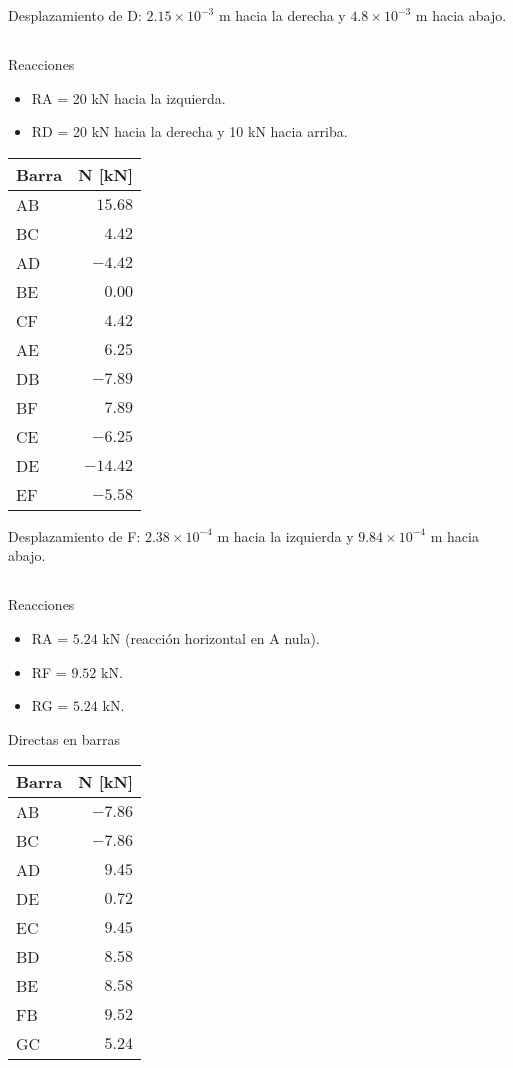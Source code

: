 Desplazamiento de D: $ 2.15 \times 10^{-3}$ m hacia la derecha y $4.8 \times 10^{-3}$ m hacia abajo.

\subsection{}

Reacciones
\begin{itemize}
\item RA = 20 kN hacia la izquierda.
\item RD = 20 kN hacia la derecha y 10 kN hacia arriba.
\end{itemize}

\begin{center}
	\begin{tabular}{lr}
		\hline
		Barra & N [kN] \\
		\hline
AB & $15.68$ \\
BC & $4.42$ \\
AD & $-4.42$ \\
BE & $0.00$ \\
CF & $4.42$ \\
AE & $6.25$ \\
DB & $-7.89$ \\
BF & $7.89$ \\
CE & $-6.25$ \\
DE & $-14.42$ \\
EF & $-5.58$ \\
\hline
\end{tabular}
\end{center}

Desplazamiento de F: $2.38 \times 10^{-4}$ m hacia la izquierda y $9.84 \times 10^{-4}$ m hacia abajo.


\subsection{}


Reacciones
\begin{itemize}
\item RA = $5.24$ kN (reacción horizontal en A nula).
\item RF = $9.52$ kN.
\item RG = $5.24$ kN.
\end{itemize}

Directas en barras

\begin{center}
	\begin{tabular}{lr}
		\hline
		Barra & N [kN] \\
		\hline
AB & $-7.86$ \\
BC & $-7.86$ \\
AD & $9.45$ \\
DE & $0.72$ \\
EC & $9.45$ \\
BD & $8.58$ \\
BE & $8.58$ \\
FB & $9.52$ \\
GC & $5.24$ \\
\hline
\end{tabular}
\end{center}

